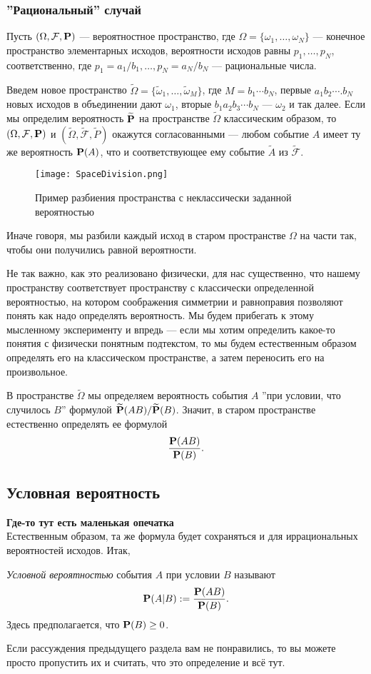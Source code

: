 \documentclass[11 pt,russian]{article}
\begin{document}
\subsubsection{''Рациональный'' случай}
Пусть $(\Omega,\mathcal{F},{\bf P})$ --- вероятностное пространство, где $\Omega=\{\omega_1,\dotsc,\omega_N\}$ --- конечное пространство элементарных исходов, вероятности исходов равны $p_1,\dotsc,p_N$, соответственно, где $p_1=a_1/b_1,\dotsc,p_N = a_N/b_N$ --- рациональные числа. 

Введем новое пространство $\widetilde{\Omega} = \{\widetilde{\omega}_1,\dotsc,\widetilde{\omega}_M\}$, где $M = b_1 \dotsm b_N$, первые $a_1 b_2 \dotsm. b_N$ новых исходов в объединении дают $\omega_1$,  вторые $b_1 a_2 b_3 \dotsm b_N$ --- $\omega_2$ и так далее. Если мы определим вероятность $\widetilde{{\bf P}}$ на пространстве $\widetilde{\Omega}$ классическим образом, то $(\Omega,\mathcal{F},{\bf P})$ и $(\widetilde{\Omega},\widetilde{\mathcal{F}},\widetilde{P})$ окажутся согласованными --- любом событие $A$ имеет ту же вероятность ${\bf P}(A)$, что и соответствующее ему событие $\widetilde{A}$ из $\widetilde{\mathcal{F}}$. 
\begin{figure}[h!]
\caption{Пример разбиения пространства с неклассически заданной вероятностью}
   \begin{center}
   \texttt{[image: SpaceDivision.png]}
   \end{center}
\end{figure}
Иначе говоря, мы разбили каждый исход в старом пространстве $\Omega$ на части так, чтобы они получились равной вероятности.

Не так важно, как это реализовано физически, для нас существенно, что нашему пространству соответствует пространству с классически определенной вероятностью, на котором соображения симметрии и равноправия позволяют понять как надо определять вероятность. Мы будем прибегать к этому мысленному эксперименту и впредь --- если мы хотим определить какое-то понятия с физически понятным подтекстом, то мы будем естественным образом определять его на классическом пространстве, а затем переносить его на произвольное. 

В пространстве $\widetilde{\Omega}$ мы определяем вероятность события $A$ ''при условии, что случилось $B$'' формулой $\widetilde{{\bf P}}(AB)/\widetilde{{\bf P}}(B)$. Значит, в старом пространстве естественно определять ее формулой
$$
\frac{{\bf P}(AB)}{{\bf P}(B)}.
$$
\subsection{Условная вероятность}
\label{CondProb}
{\bf Где-то тут есть маленькая опечатка\\ }
Естественным образом, та же формула будет сохраняться и для иррациональных вероятностей исходов. Итак,
\begin{Def}
{\it Условной вероятностью} события $A$ при условии $B$ называют
$$
{\bf P}(A|B):= \frac{{\bf P}(A B)}{{\bf P}(B)}.
$$
Здесь предполагается, что ${\bf P}(B)\ge 0$. 
\end{Def}
Если рассуждения предыдущего раздела вам не понравились, то вы можете просто пропустить их и считать, что это определение и всё тут.
\end{document}
